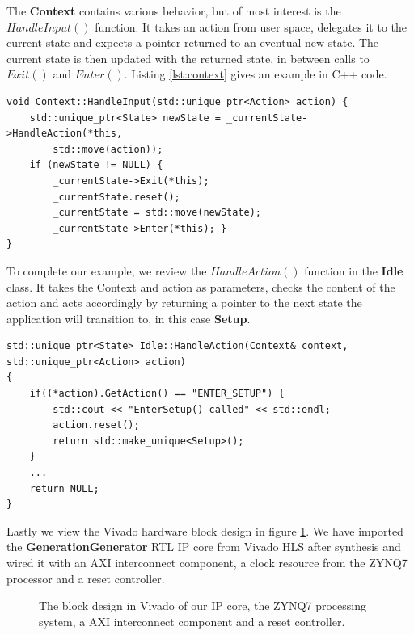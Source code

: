 The \textbf{Context} contains various behavior, but of most interest is the $HandleInput()$ function. It takes an action from user space, delegates it to the current state and expects a pointer returned to an eventual new state. The current state is then updated with the returned state, in between calls to $Exit()$ and $Enter()$. Listing \ref{lst:context} gives an example in C++ code.

\begin{lstlisting}[style=customc++,caption={The Context class holds the current state among other variables, such as best chromosome so far and parameters. Here is showed the function HandleInput() called from user side.},label={lst:context}]
void Context::HandleInput(std::unique_ptr<Action> action) {
	std::unique_ptr<State> newState = _currentState->HandleAction(*this,
		std::move(action));
	if (newState != NULL) {
		_currentState->Exit(*this);
		_currentState.reset();
		_currentState = std::move(newState);
		_currentState->Enter(*this); }
}
\end{lstlisting}

To complete our example, we review the $HandleAction()$ function in the \textbf{Idle} class. It takes the Context and action as parameters, checks the content of the action and acts accordingly by returning a pointer to the next state the application will transition to, in this case \textbf{Setup}.

\begin{lstlisting}[style=customc++,caption={The HandleAction() function in state Idle.},label={lst:stateidle}]
std::unique_ptr<State> Idle::HandleAction(Context& context, std::unique_ptr<Action> action)
{
	if((*action).GetAction() == "ENTER_SETUP") {
		std::cout << "EnterSetup() called" << std::endl;
		action.reset();
		return std::make_unique<Setup>();
	}
	...
	return NULL;
}
\end{lstlisting}

Lastly we view the Vivado hardware block design in figure \ref{fig:vivadodesign}. We have imported the \textbf{GenerationGenerator} RTL IP core from Vivado HLS after synthesis and wired it with an AXI interconnect component, a clock resource from the ZYNQ7 processor and a reset controller.

\begin{figure}[h!]
	\centering
	\caption{The block design in Vivado of our IP core, the ZYNQ7 processing system, a AXI interconnect component and a reset controller.}
	\label{fig:vivadodesign}
\end{figure}

